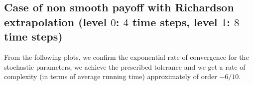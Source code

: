 \documentclass[11pt]{article}
\begin{document}
\newpage

\subsection{Case of non smooth payoff  with Richardson extrapolation (level $0$: $4$ time steps, level $1$: $8$ time steps) }





From the following plots, we confirm the exponential rate of convergence for the stochastic parameters, we achieve the prescribed tolerance and  we get a rate of complexity (in terms of average running time) approximately of order $-6/10$.
\end{document}
